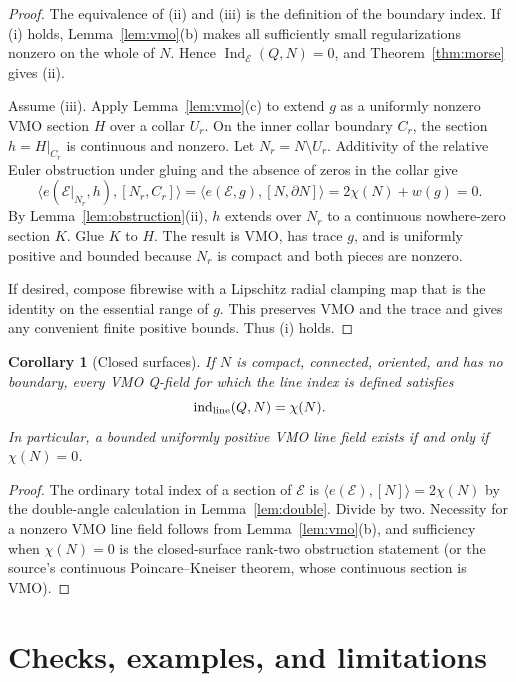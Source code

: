\documentclass[11pt]{article}
\newtheorem{corollary}[theorem]{Corollary}
\theoremstyle{definition}
\theoremstyle{remark}
\newcommand{\E}{\mathcal E}
\newcommand{\ind}{\operatorname{ind}}
\newcommand{\Ind}{\operatorname{Ind}}
\newcommand{\bd}{\partial}
\begin{document}
\begin{proof}
The equivalence of (ii) and (iii) is the definition of the boundary index.
If (i) holds, Lemma~\ref{lem:vmo}(b) makes all sufficiently small
regularizations nonzero on the whole of $N$.  Hence
$\Ind_\E(Q,N)=0$, and Theorem~\ref{thm:morse} gives (ii).

Assume (iii).  Apply Lemma~\ref{lem:vmo}(c) to extend $g$ as a uniformly
nonzero VMO section $H$ over a collar $U_r$.  On the inner collar boundary
$C_r$, the section $h=H|_{C_r}$ is continuous and nonzero.  Let
$N_r=N\setminus U_r$.  Additivity of the relative Euler obstruction under
gluing and the absence of zeros in the collar give
\[
 \langle e(\E|_{N_r},h),[N_r,C_r]\rangle
 =\langle e(\E,g),[N,\bd N]\rangle
 =2\chi(N)+w(g)=0.
\]
By Lemma~\ref{lem:obstruction}(ii), $h$ extends over $N_r$ to a continuous
nowhere-zero section $K$.  Glue $K$ to $H$.  The result is VMO, has trace
$g$, and is uniformly positive and bounded because $N_r$ is compact and both
pieces are nonzero.

If desired, compose fibrewise with a Lipschitz radial clamping map that is the
identity on the essential range of $g$.  This preserves VMO and the trace and
gives any convenient finite positive bounds.  Thus (i) holds.
\end{proof}

\begin{corollary}[Closed surfaces]\label{cor:closed}
If $N$ is compact, connected, oriented, and has no boundary, every VMO
Q-field for which the line index is defined satisfies
\[
 \ind_{\rm line}(Q,N)=\chi(N).
\]
In particular, a bounded uniformly positive VMO line field exists if and only
if $\chi(N)=0$.
\end{corollary}

\begin{proof}
The ordinary total index of a section of $\E$ is
$\langle e(\E),[N]\rangle=2\chi(N)$ by the double-angle calculation in
Lemma~\ref{lem:double}.  Divide by two.  Necessity for a nonzero VMO line
field follows from Lemma~\ref{lem:vmo}(b), and sufficiency when $\chi(N)=0$
is the closed-surface rank-two obstruction statement (or the source's
continuous Poincare--Kneiser theorem, whose continuous section is VMO).
\end{proof}

\section{Checks, examples, and limitations}
\end{document}
